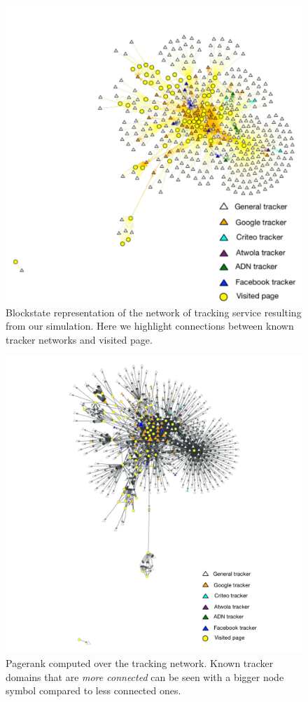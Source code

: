 \begin{figure}
\includegraphics[width=\textwidth]{figures/blockstate.pdf}
\caption{Blockstate representation of the network of tracking service resulting from our simulation. Here we highlight connections between known tracker networks and visited page.
\label{fig:blockstate}}
\end{figure}

\begin{figure}
\includegraphics[width=\textwidth]{figures/pagerank.pdf}
\caption[Pagerank of the trackers network]{Pagerank computed over the tracking network. Known tracker domains that are \emph{more connected} can be seen with a bigger node symbol compared to less connected ones.
\label{fig:pagerank}}
\end{figure}


